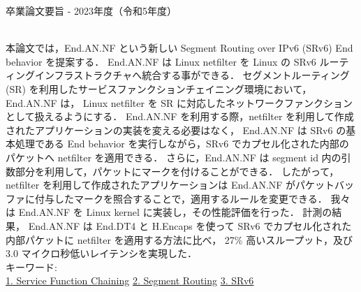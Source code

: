 卒業論文要旨 - 2023年度（令和5年度）
\begin{center}
\begin{large}
\end{large}
\end{center}

~ \\
本論文では，End.AN.NF という新しい Segment Routing over IPv6 (SRv6) End behavior を提案する．
End.AN.NF は Linux netfilter を Linux の SRv6 ルーティングインフラストラクチャへ統合する事ができる．
セグメントルーティング (SR) を利用したサービスファンクションチェイニング環境において，End.AN.NF は，
Linux netfilter を SR に対応したネットワークファンクションとして扱えるようにする．
End.AN.NF を利用する際，netfilter を利用して作成されたアプリケーションの実装を変える必要はなく，
End.AN.NF は SRv6 の基本処理である End behavior を実行しながら，SRv6 でカプセル化された内部のパケットへ netfilter を適用できる．
さらに，End.AN.NF は segment id 内の引数部分を利用して，パケットにマークを付けることができる．
したがって，netfilter を利用して作成されたアプリケーションは End.AN.NF がパケットバッファに付与したマークを照合することで，適用するルールを変更できる．
我々は End.AN.NF を Linux kernel に実装し，その性能評価を行った．
計測の結果， End.AN.NF は End.DT4 と H.Encaps を使って SRv6 でカプセル化された内部パケットに netfilter を適用する方法に比べ，
27\% 高いスループット，及び 3.0 マイクロ秒低いレイテンシを実現した．
~ \\
キーワード:\\
\underline{1. Service Function Chaining}
\underline{2. Segment Routing}
\underline{3. SRv6}
\begin{flushright}
\dept \\
\author
\end{flushright}
